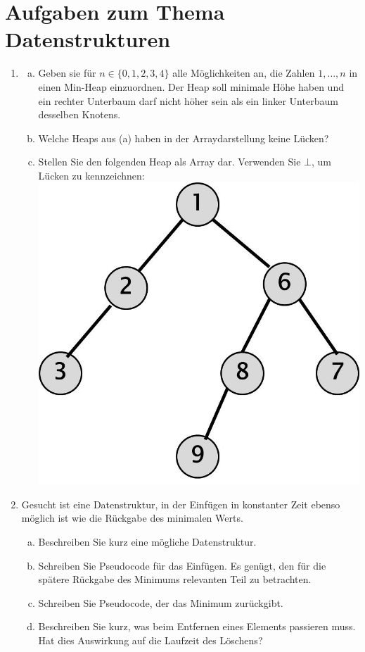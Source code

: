 \documentclass{scrartcl}
\begin{document}
\section*{Aufgaben zum Thema Datenstrukturen}
\begin{enumerate}[(1)]

\item
\begin{enumerate}[(a)]
\item Geben sie f\"ur $n\in \{0,1,2,3,4\}$ alle M\"oglichkeiten an, die Zahlen $1,\dots,n$ in einen Min-Heap einzuordnen. Der Heap soll minimale H\"ohe haben und ein rechter Unterbaum darf nicht h\"oher sein als ein linker Unterbaum desselben Knotens.
\item Welche Heaps aus (a) haben in der Arraydarstellung keine L\"ucken?
\item Stellen Sie den folgenden Heap als Array dar. Verwenden Sie $\bot$, um L\"ucken zu kennzeichnen:\newline
{\center\includegraphics[scale=0.3]{Heap.jpg}}
\end{enumerate}

\item
Gesucht ist eine Datenstruktur, in der Einf\"ugen in konstanter Zeit ebenso m\"oglich ist wie die R\"uckgabe des minimalen Werts.
\begin{enumerate}[(a)]
\item Beschreiben Sie kurz eine m\"ogliche Datenstruktur.
\item Schreiben Sie Pseudocode f\"ur das Einf\"ugen. Es gen\"ugt, den f\"ur die sp\"atere R\"uckgabe des Minimums relevanten Teil zu betrachten.
\item Schreiben Sie Pseudocode, der das Minimum zur\"uckgibt.
\item Beschreiben Sie kurz, was beim Entfernen eines Elements passieren muss. Hat dies Auswirkung auf die Laufzeit des L\"oschens?
\end{enumerate}


\end{enumerate}
\end{document}

